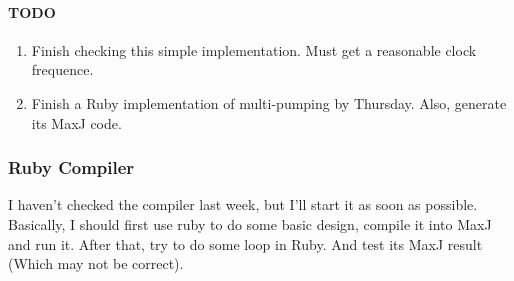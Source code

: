 \paragraph{TODO}
\begin{enumerate}
\item Finish checking this simple implementation. Must get a reasonable clock frequence.
\item Finish a Ruby implementation of multi-pumping by Thursday. Also, generate its MaxJ code.
\end{enumerate}

\subsubsection{Ruby Compiler}

I haven't checked the compiler last week, but I'll start it as soon as possible. Basically, I should first use ruby to do some basic design, compile it into MaxJ and run it. After that, try to do some loop in Ruby. And test its MaxJ result (Which may not be correct).


